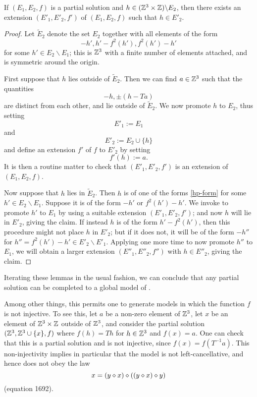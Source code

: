 \begin{lemma}[Promoting to $E_2$]\label{add-E2}  If $(E_1,E_2,f)$ is a partial solution and $h \in (\mathbb{Z}^3 \times \mathbb{Z}) \backslash E_2$, then there exists an extension $(E'_1,E'_2,f')$ of $(E_1,E_2,f)$ such that $h \in E'_2$.
\end{lemma}

\begin{proof}  Let $\tilde E_2$ denote the set $E_2$ together with all elements of the form
\begin{equation}\label{hp-form}
 -h', h' - f^2(h'), f^2(h') - h'
\end{equation}
for some $h' \in E_2 \backslash E_1$; this is $\mathbb{Z}^3$ with a finite number of elements attached, and is symmetric around the origin.

First suppose that $h$ lies outside of $\tilde E_2$.  Then we can find $a \in \mathbb{Z}^3$ such that the quantities
$$ -h, \pm (h - Ta)$$
are distinct from each other, and lie outside of $\tilde E_2$.  We now promote $h$ to $E_2$, thus setting
$$ E'_1 := E_1$$
and
$$ E'_2 := E_2 \cup \{h\}$$
and define an extension $f'$ of $f$ to $E'_2$ by setting
$$ f'(h) := a.$$
It is then a routine matter to check that $(E'_1,E'_2,f')$ is an extension of $(E_1,E_2,f)$.

Now suppose that $h$ lies in $\tilde E_2$.  Then $h$ is of one of the forms \eqref{hp-form} for some $h' \in E_2 \backslash E_1$.  Suppose it is of the form $-h'$ or $f^2(h') - h'$.  We invoke  to promote $h'$ to $E_1$ by using a suitable extension $(E'_1,E'_2,f')$; and now $h$ will lie in $E'_2$, giving the claim.  If instead $h$ is of the form $h'-f^2(h')$, then this procedure might not place $h$ in $E'_2$; but if it does not, it will be of the form $-h''$ for $h'' = f^2(h')-h' \in E'_2 \backslash E'_1$.  Applying  one more time to now promote $h''$ to $E_1$, we will obtain a larger extension $(E''_1,E''_2,f'')$ with $h \in E''_2$, giving the claim.
\end{proof}

Iterating these lemmas in the usual fashion, we can conclude that any partial solution can be completed to a global model of .

Among other things, this permits one to generate models in which the function $f$ is not injective.  To see this, let $a$ be a non-zero element of $\mathbb{Z}^3$, let $x$ be an element of $\mathbb{Z}^3 \times \mathbb{Z}$ outside of $\mathbb{Z}^3$, and consider the partial solution $(\mathbb{Z}^3, \mathbb{Z}^3 \cup \{x\}, f)$ where $f(h) = Th$ for $h \in \mathbb{Z}^3$ and $f(x) = a$.  One can check that this is a partial solution and is not injective, since $f(x) = f(T^{-1} a)$.  This non-injectivity implies in particular that the model is not left-cancellative, and hence does not obey the law
$$ x = (y \diamond x) \diamond ((y \diamond x) \diamond y)$$
(equation 1692).

